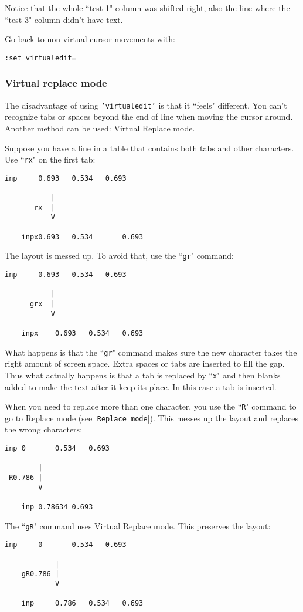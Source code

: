 Notice that the whole ``test 1" column was shifted right, also the line where the ``test 3" column didn't have text.

Go back to non-virtual cursor movements with:

\begin{Verbatim}[samepage=true]
 :set virtualedit=
\end{Verbatim}

\subsubsection{Virtual replace mode}
The disadvantage of using \texttt{'virtualedit'} is that it ``feels" different.
You can't recognize tabs or spaces beyond the end of line when moving the cursor around.
Another method can be used: Virtual Replace mode.

Suppose you have a line in a table that contains both tabs and other characters.
Use ``\texttt{rx}" on the first tab:

\begin{Verbatim}[samepage=true]
    inp     0.693   0.534   0.693 

           |
       rx  |
           V

    inpx0.693   0.534       0.693 
\end{Verbatim}

The layout is messed up.
To avoid that, use the ``\texttt{gr}" command:

\begin{Verbatim}[samepage=true]
    inp     0.693   0.534   0.693 

           |
      grx  |
           V

    inpx    0.693   0.534   0.693 
\end{Verbatim}

What happens is that the ``\texttt{gr}" command makes sure the new character takes the right amount of screen space.
Extra spaces or tabs are inserted to fill the gap.
Thus what actually happens is that a tab is replaced by ``\texttt{x}" and then blanks added to make the text after it keep its place.
In this case a tab is inserted.

When you need to replace more than one character, you use the ``\texttt{R}" command to go to Replace mode (see |\hyperref[Replace mode]{\texttt{Replace mode}}|).
This messes up the layout and replaces the wrong characters:

\begin{Verbatim}[samepage=true]
    inp 0       0.534   0.693 

        |
 R0.786 |
        V

    inp 0.78634 0.693 
\end{Verbatim}

The ``\texttt{gR}" command uses Virtual Replace mode.
This preserves the layout:

\begin{Verbatim}[samepage=true]
    inp     0       0.534   0.693 

            |
    gR0.786 |
            V

    inp     0.786   0.534   0.693 
\end{Verbatim}

\clearpage
